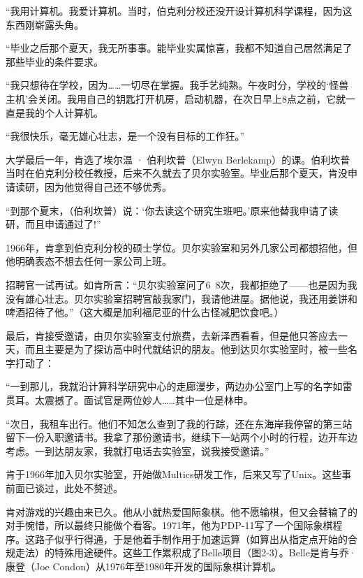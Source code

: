 \documentclass[a4paper,12pt,UTF8,twoside]{ctexbook}
\begin{document}
“我用计算机。我爱计算机。当时，伯克利分校还没开设计算机科学课程，因为这东西刚崭露头角。

“毕业之后那个夏天，我无所事事。能毕业实属惊喜，我都不知道自己居然满足了那些毕业的条件要求。

“我只想待在学校，因为……一切尽在掌握。我手艺纯熟。午夜时分，学校的‘怪兽主机’会关闭。我用自己的钥匙打开机房，启动机器，在次日早上8点之前，它就一直是我的个人计算机。

“我很快乐，毫无雄心壮志，是一个没有目标的工作狂。”

大学最后一年，肯选了埃尔温 · 伯利坎普（Elwyn Berlekamp）的课。伯利坎普当时在伯克利分校任教授，后来不久就去了贝尔实验室。毕业后那个夏天，肯没申请读研，因为他觉得自己还不够优秀。

“到那个夏末，（伯利坎普）说：‘你去读这个研究生班吧。’原来他替我申请了读研，而且申请通过了!”

1966年，肯拿到伯克利分校的硕士学位。贝尔实验室和另外几家公司都想招他，但他明确表态不想去任何一家公司上班。

招聘官一试再试。如肯所言：“贝尔实验室问了6~8次，我都拒绝了——也是因为我没有雄心壮志。贝尔实验室招聘官敲我家门，我请他进屋。据他说，我还用姜饼和啤酒招待了他。”（这大概是加利福尼亚的什么古怪减肥饮食吧。）

最后，肯接受邀请，由贝尔实验室支付旅费，去新泽西看看，但是他只答应去一天，而且主要是为了探访高中时代就结识的朋友。他到达贝尔实验室时，被一些名字打动了：

“一到那儿，我就沿计算科学研究中心的走廊漫步，两边办公室门上写的名字如雷贯耳。太震撼了。面试官是两位妙人……其中一位是林申。

“次日，我租车出行。他们不知怎么查到了我的行踪，还在东海岸我停留的第三站留下一份入职邀请书。我拿了那份邀请书，继续下一站两个小时的行程，边开车边考虑。一到达朋友家，我就打电话去实验室，说我接受邀请。”

肯于1966年加入贝尔实验室，开始做Multics研发工作，后来又写了Unix。这些事前面已谈过，此处不赘述。

肯对游戏的兴趣由来已久。他从小就热爱国际象棋。他不愿输棋，但又会替输了的对手惋惜，所以最终只能做个看客。1971年，他为PDP-11写了一个国际象棋程序。这路子似乎行得通，于是他着手制作用于加速运算（如算出从指定点开始的合规走法）的特殊用途硬件。这些工作累积成了Belle项目（图2-3）。Belle是肯与乔·康登（Joe Condon）从1976年至1980年开发的国际象棋计算机。
\end{document}
